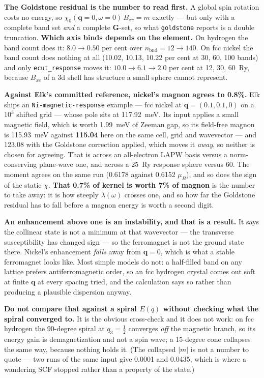 \documentclass[11pt,a4paper]{article}
\newcommand{\code}[1]{\texttt{\small #1}}
\begin{document}
\textbf{The Goldstone residual is the number to read first.} A global spin
rotation costs no energy, so $\chi_0(\mathbf q{=}0,\omega{=}0)\,B_{xc} = m$
exactly --- but only with a complete band set \emph{and} a complete
$\mathbf G$-set, so what \code{goldstone} reports is a double truncation.
\textbf{Which axis binds depends on the element.} On hydrogen the band count
does it: $8.0 \to 0.50$ per cent over $n_{\text{bnd}} = 12 \to 140$. On fcc
nickel the band count does nothing at all (10.02, 10.13, 10.22 per cent at 30,
60, 100 bands) and only \code{ecut\_response} moves it: $10.0 \to 6.1 \to 2.0$
per cent at 12, 30, 60~Ry, because $B_{xc}$ of a 3d shell has structure a small
sphere cannot represent.

\textbf{Against Elk's committed reference, nickel's magnon agrees to 0.8\%.}
Elk ships an \code{Ni-magnetic-response} example --- fcc nickel at
$\mathbf q = (0.1,0.1,0)$ on a $10^3$ shifted grid --- whose pole sits at
117.92~meV. Its input applies a small magnetic field, which is worth 1.99~meV
of Zeeman gap, so its field-free magnon is 115.93~meV against \textbf{115.04}
here on the same cell, grid and wavevector --- and 123.08 with the Goldstone
correction applied, which moves it \emph{away}, so neither is chosen for
agreeing. That is across an all-electron LAPW basis versus a norm-conserving
plane-wave one, and across a 25~Ry response sphere versus 60. The moment agrees
on the same run (0.6178 against 0.6152 $\mu_B$), and so does the sign of the
static $\chi$. \textbf{That 0.7\% of kernel is worth 7\% of magnon} is the
number to take away: it is how steeply $\lambda(\omega)$ crosses one, and so how
far the Goldstone residual has to fall before a magnon energy is worth a second
digit.

\textbf{An enhancement above one is an instability, and that is a result.} It
says the collinear state is not a minimum at that wavevector --- the transverse
susceptibility has changed sign --- so the ferromagnet is not the ground state
there. Nickel's enhancement \emph{falls} away from $\mathbf q = 0$, which is
what a stable ferromagnet looks like. Most simple models do not: a half-filled
band on any lattice prefers antiferromagnetic order, so an fcc hydrogen crystal
comes out soft at finite $\mathbf q$ at every spacing tried, and the calculation
says so rather than producing a plausible dispersion anyway.

\textbf{Do not compare that against a spiral $E(q)$ without checking what the
spiral converged to.} It is the obvious cross-check and it does not work: on fcc
hydrogen the 90-degree spiral at $q_3 = \tfrac12$ converges \emph{off} the
magnetic branch, so its energy gain is demagnetization and not a spin wave; a
15-degree cone collapses the same way, because nothing holds it. (The collapsed
$|m|$ is not a number to quote --- two runs of the same input give 0.0001 and
0.0435, which is where a wandering SCF stopped rather than a property of the
state.)
\end{document}
